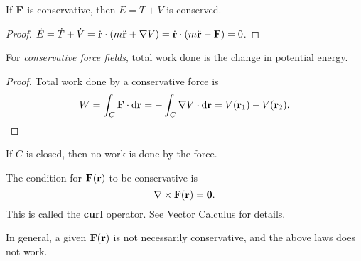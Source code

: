 \begin{proposition}
    If ${\bf F}$ is conservative, then $ E=T+V $ is conserved.
\end{proposition}
\begin{proof}
    $ \dot{E}=\dot{T}+\dot{V} = \dot{{\bf r}}\cdot(m  \ddot{{\bf r}}+ \nabla V)=\dot{{\bf r}}\cdot(m  \ddot{{\bf r}}-{\bf F})=0$.
\end{proof}
\begin{proposition}
    For \textit{conservative force fields}, total work done is the change in potential energy.
\end{proposition}
\begin{proof}
    Total work done by a conservative force is 
    \[
        W = \int_{C} {\bf F} \cdot\mathrm{d}\mathbf{r} = -\int_{C} \nabla V \cdot\mathrm{d}\mathbf{r} = V({\bf r}_1)-V({\bf r}_2).
    \]
\end{proof}
\begin{corollary}
    If $C$ is closed, then no work is done by the force.
\end{corollary}
\begin{note}
    The condition for $ {\bf F}({\bf r}) $ to be conservative is 
    \[
        \nabla \times {\bf F}({\bf r}) = \mathbf{0}.
    \]
    This is called the \textbf{curl} operator. See Vector Calculus for details.
\end{note}
\begin{remark}
    In general, a given $ {\bf F}({\bf r}) $ is not necessarily conservative, and the above laws does not work.
\end{remark}
